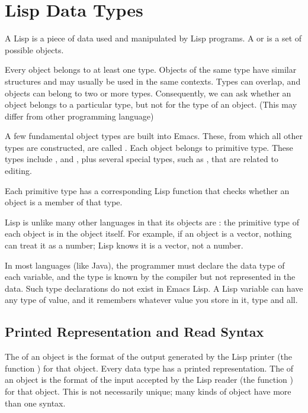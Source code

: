 
\chapter{Lisp Data Types}
\label{cha:lisp-data-types}

A Lisp  is a piece of data used and manipulated by Lisp programs.
A  or  is a set of possible objects.

Every object belongs to at least one type.
Objects of the same type have similar structures and may usually be used in the same contexts.
Types can overlap, and objects can belong to two or more types.
Consequently, we can ask whether an object belongs to a particular type, but not for the type of an object.
(This may differ from other programming language)


A few fundamental object types are built into Emacs.
These, from which all other types are constructed, are called .
Each object belongs to  primitive type.
These types include , and , plus several special types, such as , that are related to editing.

Each primitive type has a corresponding Lisp function that checks whether an object is a member of that type.

Lisp is unlike many other languages in that its objects are : the primitive type of each object is  in the object itself.
For example, if an object is a vector, nothing can treat it as a number; Lisp knows it is a vector, not a number.


In most languages (like Java), the programmer must declare the data type of each variable, and the type is known by the compiler but not represented in the data.
Such type declarations do not exist in Emacs Lisp.
A Lisp variable can have any type of value, and it remembers whatever value you store in it, type and all. 

\section{Printed Representation and Read Syntax}
\label{sec:print-repr-read}

The  of an object is the format of the output generated by the Lisp printer (the function ) for that object.
Every data type has a  printed representation.
The  of an object is the format of the input accepted by the Lisp reader (the function ) for that object.
This is not necessarily unique; many kinds of object have more than one syntax.

